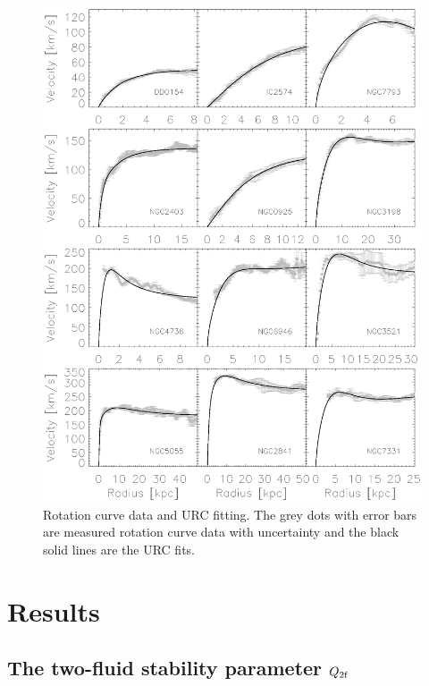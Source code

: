 \documentclass[12pt,preprint]{aastex}
\begin{document}
\begin{figure}
\begin{center}
\includegraphics[scale=0.8]{vrot.eps}  \caption{Rotation curve data and URC fitting. The grey dots with error bars are measured rotation curve data with uncertainty and the black solid lines are the URC fits. }
\label{vrot}
\end{center}
\end{figure}


\section{Results}
\label{results}




\subsection{The two-fluid stability parameter $Q_{\rm 2f}$}
\end{document}
